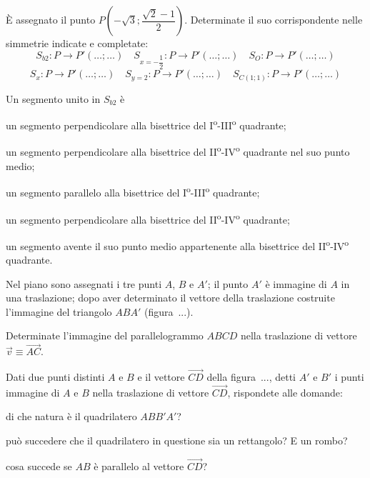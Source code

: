 \begin{esercizio}
\label{ese:8.42} %
\`E assegnato il punto $P\left(-\sqrt{3};\dfrac{\sqrt{2}-1}{2}\right)$. Determinate il suo corrispondente nelle simmetrie indicate e completate:
\[S_{b2}:P\rightarrow P'(\ldots{};\ldots{})\quad S_{x=-\dfrac{1}{2}}:P\rightarrow P'(\ldots{};\ldots{}) \quad S_{O}:P\rightarrow P'(\ldots{};\ldots{})\]
\[S_{x}:P\rightarrow P'(\ldots{};\ldots{})\quad S_{y=2}:P\rightarrow P'(\ldots{};\ldots{}) \quad S_{C(1;1)}:P\rightarrow P'(\ldots{};\ldots{})\]
\end{esercizio}

\begin{esercizio}
\label{ese:8.43} %
Un segmento unito in $S_{b2}$ è
\begin{enumeratea}
\item un segmento perpendicolare alla bisettrice del I\textsuperscript{o}-III\textsuperscript{o} quadrante;
\item un segmento perpendicolare alla bisettrice del II\textsuperscript{o}-IV\textsuperscript{o} quadrante nel suo punto medio;
\item un segmento parallelo alla bisettrice del I\textsuperscript{o}-III\textsuperscript{o} quadrante;
\item un segmento perpendicolare alla bisettrice del II\textsuperscript{o}-IV\textsuperscript{o} quadrante;
\item un segmento avente il suo punto medio appartenente alla bisettrice del II\textsuperscript{o}-IV\textsuperscript{o} quadrante.
\end{enumeratea}
\end{esercizio}

\begin{esercizio}
\label{ese:8.44} %
Nel piano sono assegnati i tre punti $A$, $B$ e $A'$; il punto $A'$ è immagine di $A$ in una traslazione; dopo aver determinato il vettore della traslazione costruite l'immagine del triangolo $ABA'$ (figura~...).
\end{esercizio}

\begin{esercizio}
\label{ese:8.45} %
Determinate l'immagine del parallelogrammo $ABCD$ nella traslazione di vettore $\vec{v} \equiv \overrightarrow{AC}$.
\end{esercizio}

\begin{esercizio}
\label{ese:8.46} %
Dati due punti distinti $A$ e $B$ e il vettore $\overrightarrow{CD}$ della figura~..., detti $A'$ e $B'$ i punti immagine di $A$ e $B$ nella traslazione di vettore $\overrightarrow{CD}$, rispondete alle domande:
\begin{enumeratea}
\item di che natura è il quadrilatero $ABB'A'$?
\item può succedere che il quadrilatero in questione sia un rettangolo? E un rombo?
\item cosa succede se $AB$ è parallelo al vettore $\overrightarrow{CD}$?
\end{enumeratea}
\end{esercizio}

